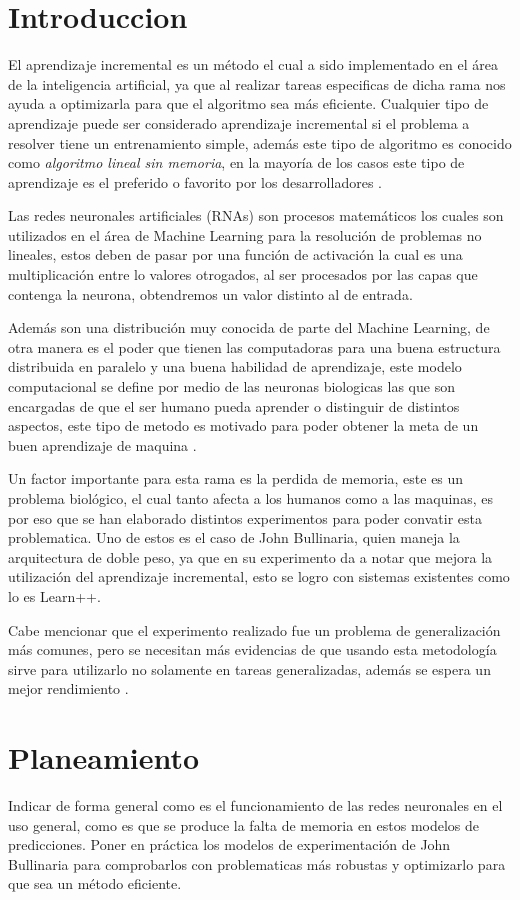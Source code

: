 \section{Introduccion}

El aprendizaje incremental es un método el cual a sido implementado en el área de la inteligencia artificial, ya que al realizar tareas especificas de dicha rama nos 
ayuda a optimizarla para que el algoritmo sea más eficiente.
Cualquier tipo de aprendizaje puede ser considerado aprendizaje incremental si el problema a resolver tiene un entrenamiento simple, adem\'as este tipo de algoritmo es conocido como \textit{algoritmo lineal sin memoria},
en la mayor\'ia de los casos este tipo de aprendizaje es el preferido o favorito por los desarrolladores \cite{GiraudCarrier2000}.

Las redes neuronales artificiales (RNAs) son procesos matem\'aticos los cuales son utilizados en el \'area de Machine Learning para 
la resoluci\'on de problemas no lineales, estos deben de pasar por una funci\'on de activaci\'on la cual es una multiplicaci\'on 
entre lo valores otrogados, al ser procesados por las capas que contenga la neurona, obtendremos un valor distinto al de entrada.

Adem\'as son una distribuci\'on muy conocida de parte del Machine Learning, de otra manera es el poder que tienen las computadoras para una buena estructura distribuida en paralelo y una buena habilidad de aprendizaje, 
este modelo computacional se define por medio de las neuronas biologicas las que son encargadas de que el ser humano pueda aprender o distinguir de distintos aspectos, este tipo de 
metodo es motivado para poder obtener la meta de un buen aprendizaje de maquina \cite{liu2015}.

Un factor importante para esta rama es la perdida de memoria, este es un problema biol\'ogico, el cual tanto afecta a los humanos como a las maquinas, es por eso que se han elaborado distintos
experimentos para poder convatir esta problematica.
Uno de  estos es el caso de John Bullinaria, quien maneja la arquitectura de doble peso, ya que en su experimento da a notar que mejora la utilizaci\'on del aprendizaje incremental, esto se logro 
con sistemas existentes como lo es Learn++.

Cabe mencionar que el experimento realizado fue un problema de generalizaci\'on m\'as comunes, pero se necesitan m\'as evidencias 
de que usando esta metodolog\'ia sirve para utilizarlo no solamente en tareas generalizadas, adem\'as se espera un mejor rendimiento \cite{Bullinaria2009}.  \\


\section{Planeamiento}

    Indicar de forma general como es el funcionamiento de las redes neuronales en el uso general, como es que se produce la falta de memoria en 
    estos modelos de predicciones. Poner en pr\'actica los modelos de experimentación de John Bullinaria para comprobarlos con
    problematicas m\'as robustas y optimizarlo para que sea un m\'etodo eficiente.
